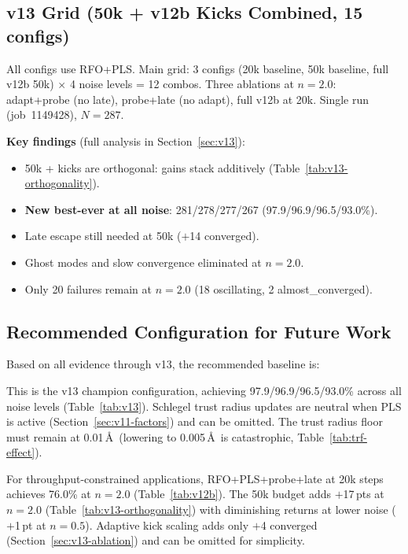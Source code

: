 \documentclass[11pt,a4paper]{article}
\theoremstyle{definition}
\begin{document}
\subsection{v13 Grid (50k + v12b Kicks Combined, 15 configs)}

All configs use RFO+PLS.  Main grid: 3 configs (20k baseline, 50k
baseline, full v12b 50k) $\times$ 4 noise levels = 12 combos.
Three ablations at $n=2.0$: adapt+probe (no late), probe+late (no adapt),
full v12b at 20k.  Single run (job~1149428), $N=287$.

\textbf{Key findings} (full analysis in Section~\ref{sec:v13}):
\begin{itemize}[nosep]
  \item 50k + kicks are orthogonal: gains stack additively
    (Table~\ref{tab:v13-orthogonality}).
  \item \textbf{New best-ever at all noise}: 281/278/277/267 (97.9/96.9/96.5/93.0\%).
  \item Late escape still needed at 50k ($+$14 converged).
  \item Ghost modes and slow convergence eliminated at $n=2.0$.
  \item Only 20 failures remain at $n=2.0$ (18 oscillating, 2 almost\_converged).
\end{itemize}

\subsection{Recommended Configuration for Future Work}

Based on all evidence through v13, the recommended baseline is:
\begin{center}
\end{center}
This is the v13 champion configuration, achieving 97.9/96.9/96.5/93.0\%
across all noise levels (Table~\ref{tab:v13}).  Schlegel trust radius
updates are neutral when PLS is active (Section~\ref{sec:v11-factors})
and can be omitted.  The trust radius floor must remain at 0.01\,\AA\
(lowering to 0.005\,\AA\ is catastrophic, Table~\ref{tab:trf-effect}).

For throughput-constrained applications, RFO+PLS+probe+late at 20k steps
achieves 76.0\% at $n=2.0$ (Table~\ref{tab:v12b}).  The 50k budget adds
$+$17\,pts at $n=2.0$ (Table~\ref{tab:v13-orthogonality}) with
diminishing returns at lower noise ($+$1\,pt at $n=0.5$).
Adaptive kick scaling adds only $+$4 converged (Section~\ref{sec:v13-ablation})
and can be omitted for simplicity.
\end{document}
